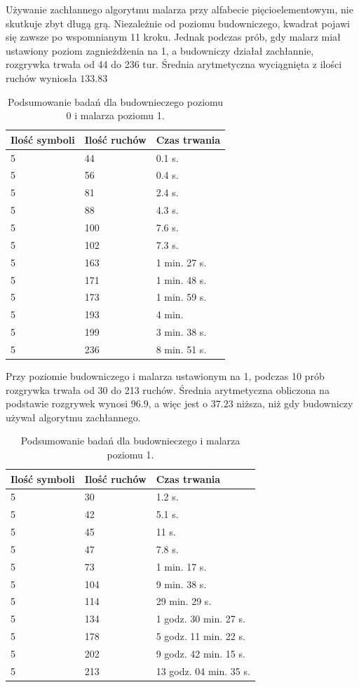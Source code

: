 \documentclass[document]{xmgr}
\begin{document}
Używanie zachłannego algorytmu malarza przy alfabecie pięcioelementowym,  nie skutkuje zbyt długą grą. Niezależnie od poziomu budowniczego, kwadrat pojawi się zawsze po wspomnianym 11 kroku. Jednak podczas prób, gdy malarz miał ustawiony poziom zagnieżdżenia na 1, a budowniczy działał zachłannie, rozgrywka trwała od 44 do 236 tur. Średnia arytmetyczna wyciągnięta z ilości ruchów wyniosła $133.83$

\begin{table}[tbh]
    \centering
	\begin{tabular}{|l|l|l|} \hline
	Ilość symboli & Ilość ruchów & Czas trwania \\ \hline
	5 & 44 & 0.1 s.\\ \hline
	5 & 56 & 0.4 s.\\ \hline
	5 & 81 & 2.4 s.\\ \hline
	5 & 88 & 4.3 s.\\ \hline
	5 & 100 & 7.6 s.\\ \hline
	5 & 102 & 7.3 s.\\ \hline
	5 & 163 & 1 min. 27 s. \\ \hline
	5 & 171 & 1 min. 48 s. \\ \hline
	5 & 173 & 1 min. 59 s. \\ \hline
	5 & 193 & 4 min. \\ \hline
	5 & 199 & 3 min. 38 s.\\ \hline
	5 & 236 & 8 min. 51 s. \\ \hline
	\end{tabular}
	\caption{Podsumowanie badań dla budownieczego poziomu 0 i malarza poziomu 1.}
	\label{fig:builder0Painter1Table}
\end{table}


Przy poziomie budowniczego i malarza ustawionym na 1, podczas 10 prób rozgrywka trwała od 30 do 213 ruchów. Średnia arytmetyczna obliczona na podstawie rozgrywek wynosi $96.9$, a więc jest o $37.23$ niższa, niż gdy budowniczy używał algorytmu zachłannego. 

\begin{table}[tbh]
    \centering
	\begin{tabular}{|l|l|l|} \hline
	Ilość symboli & Ilość ruchów & Czas trwania \\ \hline
	5 & 30 & 1.2 s. \\ \hline	
	5 & 42 & 5.1 s. \\ \hline
	5 & 45 & 11 s. \\ \hline	
	5 & 47 & 7.8 s. \\ \hline
	5 & 73 & 1 min. 17 s. \\ \hline
	5 & 104 & 9 min. 38 s. \\ \hline
	5 & 114 & 29 min. 29 s. \\ \hline
	5 & 134 & 1 godz. 30 min. 27 s.  \\ \hline
	5 & 178 & 5 godz. 11 min. 22 s. \\ \hline
	5 & 202 & 9 godz. 42 min. 15 s. \\ \hline
	5 & 213 & 13 godz. 04 min. 35 s. \\ \hline
	\end{tabular}
	\caption{Podsumowanie badań dla budownieczego i malarza poziomu 1.}
	\label{fig:builder1Painter1Table}
\end{table}
\end{document}
